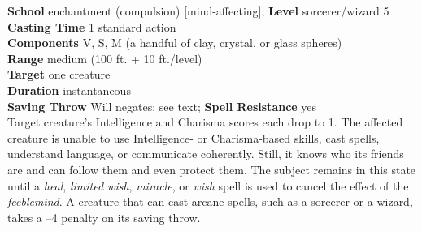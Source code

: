\textbf{School} enchantment (compulsion) [mind-affecting]; \textbf{Level} sorcerer/wizard 5\\
\textbf{Casting Time} 1 standard action\\
\textbf{Components} V, S, M (a handful of clay, crystal, or glass spheres)\\
\textbf{Range }medium (100 ft. + 10 ft./level)\\
\textbf{Target} one creature\\
\textbf{Duration} instantaneous\\
\textbf{Saving Throw }Will negates; see text; \textbf{Spell Resistance} yes\\
Target creature's Intelligence and Charisma scores each drop to 1. The affected creature is unable to use Intelligence- or Charisma-based skills, cast spells, understand language, or communicate coherently. Still, it knows who its friends are and can follow them and even protect them. The subject remains in this state until a \textit{heal}, \textit{limited wish}, \textit{miracle}, or \textit{wish }spell is used to cancel the effect of the \textit{feeblemind}. A creature that can cast arcane spells, such as a sorcerer or a wizard, takes a –4 penalty on its saving throw.\\
